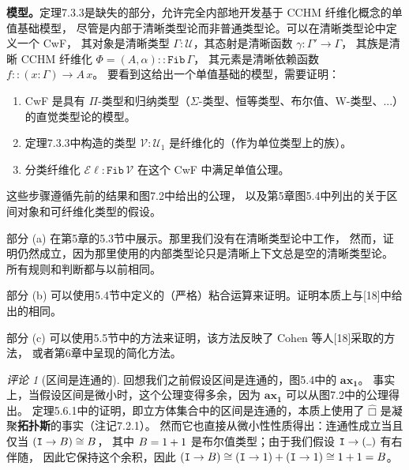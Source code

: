\documentclass{ctexrep}
\let\mathbb\relax %
\theoremstyle{plain}
\theoremstyle{definition}
\theoremstyle{remark}
\newtheorem{remark}[theorem]{评论}
\newcommand\ttI{\mathtt{I}}
\newcommand\hatcube{\widehat{□}}
\newcommand{\ax}[1]{\mathbf{ax_{#1}}}
\newcommand{\ul}{{\rule[0ex]{0.5em}{0.4pt}}} %
\begin{document}
\textbf{模型。}定理7.3.3是缺失的部分，允许完全内部地开发基于 CCHM 纤维化概念的单值基础模型，
尽管是内部于清晰类型论而非普通类型论。可以在清晰类型论中定义一个 CwF，
其对象是清晰类型 $\Gamma : \mathcal{U}$，其态射是清晰函数 $\gamma : \Gamma' \to \Gamma$，
其族是清晰 CCHM 纤维化 $\Phi = (A, \alpha) :: \mathtt{Fib}\,\Gamma$，
其元素是清晰依赖函数 $f :: (x : \Gamma) \to A\,x$。
要看到这给出一个单值基础的模型，需要证明：
\begin{enumerate}[label=(\alph*)]
\item CwF 是具有 $\Pi$-类型和归纳类型（$\Sigma$-类型、恒等类型、布尔值、W-类型、...）的直觉类型论的模型。
\item 定理7.3.3中构造的类型 $\mathcal{V} : \mathcal{U}_1$ 是纤维化的（作为单位类型上的族）。
\item 分类纤维化 $\mathcal{E}\!\ell : \mathtt{Fib}\,\mathcal{V}$ 在这个 CwF 中满足单值公理。
\end{enumerate}

这些步骤遵循先前的结果和图7.2中给出的公理，
以及第5章图5.4中列出的关于区间对象和可纤维化类型的假设。

部分 (a) 在第5章的5.3节中展示。那里我们没有在清晰类型论中工作，
然而，证明仍然成立，因为那里使用的内部类型论只是清晰上下文总是空的清晰类型论。
所有规则和判断都与以前相同。

部分 (b) 可以使用5.4节中定义的（严格）粘合运算来证明。证明本质上与[18]中给出的相同。

部分 (c) 可以使用5.5节中的方法来证明，该方法反映了 Cohen 等人[18]采取的方法，
或者第6章中呈现的简化方法。

\begin{remark}[区间是连通的]
回想我们之前假设区间是连通的，图5.4中的 $\ax{1}$。
事实上，当假设区间是微小时，这个公理变得多余，因为 $\ax{1}$ 可以从图7.2中的公理得出。
定理5.6.1中的证明，即立方体集合中的区间是连通的，本质上使用了 $\hatcube$ 是凝聚\textbf{拓扑斯}的事实（注记7.2.1）。
然而它也直接从微小性性质得出：连通性成立当且仅当 $(\ttI \to \mathbb{B}) \cong \mathbb{B}$，
其中 $\mathbb{B} = 1 + 1$ 是布尔值类型；由于我们假设 $\ttI \to (\ul)$ 有右伴随，
因此它保持这个余积，因此 $(\ttI \to \mathbb{B}) \cong (\ttI \to 1) + (\ttI \to 1) \cong 1 + 1 = \mathbb{B}$。
\end{remark}
\end{document}
